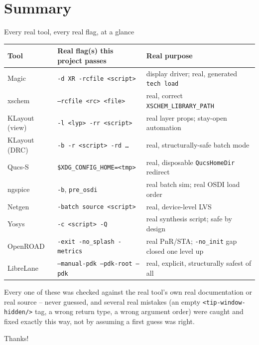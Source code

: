\documentclass[aspectratio=169]{beamer}
\begin{document}
\section{Summary}
\begin{frame}[fragile]{Every real tool, every real flag, at a glance}
\footnotesize
\begin{center}
\begin{tabularx}{\textwidth}{llX}
\toprule
Tool & Real flag(s) this project passes & Real purpose \\
\midrule
Magic & \texttt{-d XR -rcfile <script>} & display driver; real, generated \texttt{tech load} \\
xschem & \texttt{--rcfile <rc> <file>} & real, correct \texttt{XSCHEM\_LIBRARY\_PATH} \\
KLayout (view) & \texttt{-l <lyp> -rr <script>} & real layer props; stay-open automation \\
KLayout (DRC) & \texttt{-b -r <script> -rd \dots} & real, structurally-safe batch mode \\
Qucs-S & \texttt{\$XDG\_CONFIG\_HOME=<tmp>} & real, disposable \texttt{QucsHomeDir} redirect \\
ngspice & \texttt{-b}, \texttt{pre\_osdi} & real batch sim; real OSDI load order \\
Netgen & \texttt{-batch source <script>} & real, device-level LVS \\
Yosys & \texttt{-c <script> -Q} & real synthesis script; safe by design \\
OpenROAD & \texttt{-exit -no\_splash -metrics} & real PnR/STA; \texttt{-no\_init} gap closed one level up \\
LibreLane & \texttt{--manual-pdk --pdk-root --pdk} & real, explicit, structurally safest of all \\
\bottomrule
\end{tabularx}
\end{center}
\normalsize
Every one of these was checked against the real tool's own real
documentation or real source -- never guessed, and several real
mistakes (an empty \texttt{<tip-window-hidden/>} tag, a wrong return
type, a wrong argument order) were caught and fixed exactly this way,
not by assuming a first guess was right.
\end{frame}

\begin{frame}
\centering\Large Thanks!
\end{frame}
\end{document}
